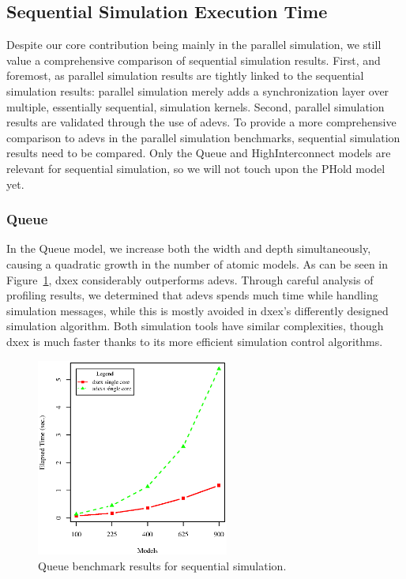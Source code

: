 \subsection{Sequential Simulation Execution Time}
Despite our core contribution being mainly in the parallel simulation, we still value a comprehensive comparison of sequential simulation results.
First, and foremost, as parallel simulation results are tightly linked to the sequential simulation results: parallel simulation merely adds a synchronization layer over multiple, essentially sequential, simulation kernels.
Second, parallel simulation results are validated through the use of adevs.
To provide a more comprehensive comparison to adevs in the parallel simulation benchmarks, sequential simulation results need to be compared.
Only the Queue and HighInterconnect models are relevant for sequential simulation, so we will not touch upon the PHold model yet.

\subsubsection{Queue}
In the Queue model, we increase both the width and depth simultaneously, causing a quadratic growth in the number of atomic models.
As can be seen in Figure~\ref{fig:Queue_benchmark}, dxex considerably outperforms adevs.
Through careful analysis of profiling results, we determined that adevs spends much time while handling simulation messages, while this is mostly avoided in dxex's differently designed simulation algorithm.
Both simulation tools have similar complexities, though dxex is much faster thanks to its more efficient simulation control algorithms.

\begin{figure}
	\includegraphics[width=\columnwidth,height=6.5cm]{fig/queue_sequential.eps}
	\caption{Queue benchmark results for sequential simulation.}
	\label{fig:Queue_benchmark}
\end{figure}

